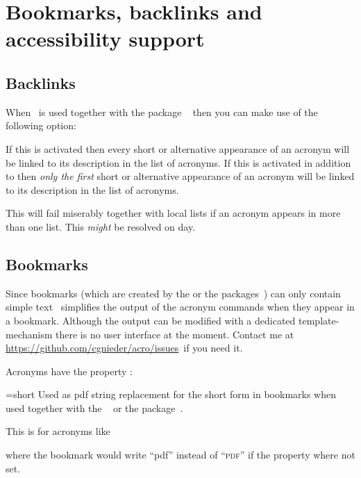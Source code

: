 \documentclass{acro-manual}
\newcommand*\issues{\url{https://github.com/cgnieder/acro/issues}}
\begin{document}
\section{Bookmarks, backlinks and accessibility support}\label{sec:pdf-properties}
\subsection{Backlinks}\label{sec:backlinks}
When \acro\ is used together with the package
~\cite{pkg:hyperref} then you can make use of the following
option:
\begin{options}
    If this is activated then every short or alternative appearance of an
    acronym will be linked to its description in the list of acronyms.
    If this is activated in addition to 
    then \emph{only the first} short or alternative appearance of an acronym
    will be linked to its description in the list of acronyms.
\end{options}
\begin{bewareofthedog}
  This will fail miserably together with local lists if an acronym appears in
  more than one list.  This \emph{might} be resolved on day.
\end{bewareofthedog}

\subsection{Bookmarks}\label{sec:bookmarks}
Since bookmarks (which are created by the  or the 
packages~\cite{pkg:bookmark}) can only contain simple text \acro\ simplifies
the output of the acronym commands when they appear in a bookmark.  Although
the output can be modified with a dedicated template-mechanism there is no
user interface at the moment.  Contact me at \issues\ if you need it.

Acronyms have the property :
\begin{properties}
  \Initial={short}
    Used as \acs{pdf} string replacement for the short form in bookmarks when
    used together with the ~\cite{pkg:hyperref} or the
     package~\cite{pkg:bookmark}.
\end{properties}

This is for acronyms like
\begin{sourcecode}
\end{sourcecode}
where the bookmark would write \enquote{pdf} instead of \enquote{\textsc{pdf}}
if the property where not set.
\end{document}
